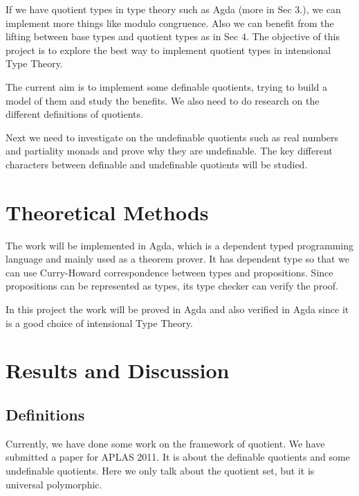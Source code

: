 \documentclass[envcountsame]{llncs}
\begin{document}
If we have quotient types in type theory such as Agda (more in Sec 3.), we can implement more things like modulo congruence. Also we can benefit from the lifting between base types and quotient types as in Sec 4.  The objective of this project is to explore the best way to implement quotient types in intensional Type Theory.

% 

The current aim is to implement some definable quotients, trying to build a model of them and study the benefits.
We also need to do research on the different definitions of quotients.

Next we need to investigate on the undefinable quotients such as real numbers and partiality monads and prove why they are undefinable. The key different characters between definable and undefinable quotients will be studied. 
\section{Theoretical Methods}
The work will be implemented in Agda, which is a dependent typed programming language and mainly used as a theorem prover.
It has dependent type so that we can use Curry-Howard correspondence between types and propositions. Since propositions can be represented as types, its type checker can verify the proof.

In this project the work will be proved in Agda and also verified in Agda since it is a good choice of intensional Type Theory.

\section{Results and Discussion}


\subsection{Definitions}

Currently, we have done some work on the framework of quotient.
We have submitted a paper \cite{aan} for APLAS 2011.
It is about the definable quotients and some undefinable quotients. Here we only talk about the quotient set, but it is universal polymorphic. 
\end{document}
